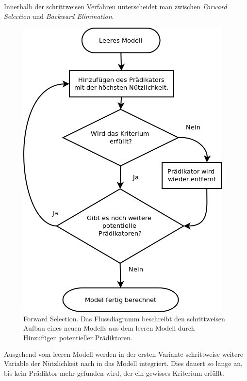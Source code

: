 Innerhalb der schrittweisen Verfahren unterscheidet man zwischen \textit{Forward Selection} und \textit{Backward Elimination}. 
\begin{figure}[H]
	\centering
	\includegraphics[height=0.5\textheight]{forward_stepwise.png}
	\caption{Forward Selection. Das Flussdiagramm beschreibt den schrittweisen Aufbau eines neuen Modells aus dem leeren Modell durch Hinzufügen potentieller Prädiktoren.}
	\label{fig:forward_stepwise}
\end{figure}
Ausgehend vom leeren Modell werden in der ersten Variante schrittweise weitere Variable der Nützlichkeit nach in das Modell integriert. Dies dauert so lange an, bis kein Prädiktor mehr gefunden wird, der ein gewisses Kriterium erfüllt.
